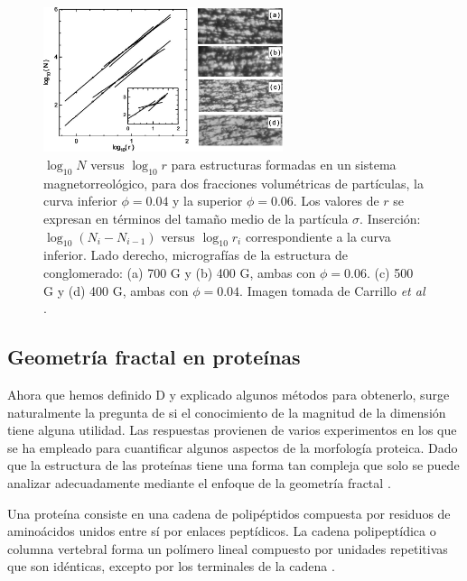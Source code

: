 \documentclass[11pt]{article}
\begin{document}
\begin{figure}[h]
\vspace{1cm}
\centering
{\includegraphics[width=7cm]{Carrillo2006} \par}
\caption{ $\log_{10}N$ versus $\log_{10}r$ para estructuras formadas en un sistema magnetorreológico, para dos fracciones volumétricas de partículas, la curva inferior $\phi = 0.04$ y la superior $\phi = 0.06$. Los valores de $r$ se expresan en términos del tamaño medio de la partícula $\sigma$. Inserción: $\log_{10}(N_i - N_{i-1})$ versus $\log_{10} r_i$ correspondiente a la curva inferior. Lado derecho, micrografías de la estructura de conglomerado: (a) 700 G y (b) 400 G, ambas con $\phi = 0.06$. (c) 500 G y (d) 400 G, ambas con $\phi = 0.04$. Imagen tomada de Carrillo \textit{et al} \cite{Carrillo2003}.}
\label{fig:Carrillo2003}
\end{figure}

   


\subsection{Geometr\'{i}a fractal en prote\'{i}nas}

Ahora que hemos definido D y explicado algunos m\'{e}todos para obtenerlo, surge naturalmente la pregunta de si el conocimiento de la magnitud de la dimensi\'{o}n tiene alguna utilidad. Las respuestas provienen de varios experimentos en los que se ha empleado para cuantificar algunos aspectos de la morfolog\'{i}a proteica. Dado que la estructura de las prote\'{i}nas tiene una forma tan compleja que solo se puede analizar adecuadamente mediante el enfoque de la geometr\'{i}a fractal \cite{Mustafa1996}. 

Una prote\'{i}na consiste en una cadena de polip\'{e}ptidos compuesta por residuos de amino\'{a}cidos unidos entre s\'{i} por enlaces pept\'{i}dicos. La cadena polipept\'{i}dica o columna vertebral forma un pol\'{i}mero lineal compuesto por unidades repetitivas que son id\'{e}nticas, excepto por los terminales de la cadena \cite{Mustafa1996}.
\end{document}
